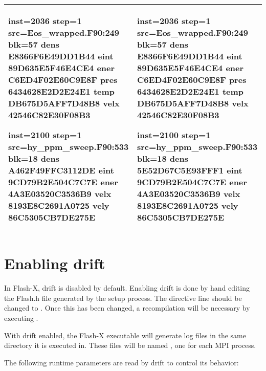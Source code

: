 \begin{tabular}{|p{}|p{}|}
\hline
\begin{scriptsize}
\begin{codeseg}
inst=2036
step=1
src=Eos_wrapped.F90:249
blk=57
 dens E8366F6E49DD1B44
 eint 89D635E5F46E4CE4
 ener C6ED4F02E60C9E8F
 pres 6434628E2D2E24E1
 temp DB675D5AFF7D48B8
 velx 42546C82E30F08B3

inst=2100
step=1
src=hy_ppm_sweep.F90:533
blk=18
 dens A462F49FFC3112DE
 eint 9CD79B2E504C7C7E
 ener 4A3E03520C3536B9
 velx 8193E8C2691A0725
 vely 86C5305CB7DE275E
\end{codeseg}
\end{scriptsize}
&
\begin{scriptsize}
\begin{codeseg}
inst=2036
step=1
src=Eos_wrapped.F90:249
blk=57
 dens E8366F6E49DD1B44
 eint 89D635E5F46E4CE4
 ener C6ED4F02E60C9E8F
 pres 6434628E2D2E24E1
 temp DB675D5AFF7D48B8
 velx 42546C82E30F08B3

inst=2100
step=1
src=hy_ppm_sweep.F90:533
blk=18
 dens 5E52D67C5E93FFF1
 eint 9CD79B2E504C7C7E
 ener 4A3E03520C3536B9
 velx 8193E8C2691A0725
 vely 86C5305CB7DE275E
\end{codeseg}
\end{scriptsize}
\\
\hline
\end{tabular}

\section{Enabling drift}
In Flash-X, drift is disabled by default.  Enabling drift is done by
hand editing the Flash.h file generated by the setup process.  The directive
line  should be changed to
.  Once this has been changed, a recompilation will be
necessary by executing .

With drift enabled, the Flash-X executable will generate log files in the same
directory it is executed in.  These files will be named ,
one for each MPI process.

The following runtime parameters are read by drift to control its behavior:

